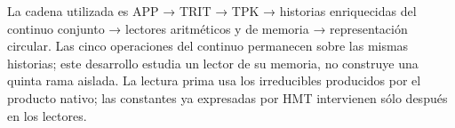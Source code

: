 % 
% 
% 
La cadena utilizada es APP → TRIT → TPK → historias enriquecidas del continuo conjunto → lectores aritméticos y de memoria → representación circular. Las cinco operaciones del continuo permanecen sobre las mismas historias; este desarrollo estudia un lector de su memoria, no construye una quinta rama aislada. La lectura prima usa los irreducibles producidos por el producto nativo; las constantes ya expresadas por HMT intervienen sólo después en los lectores.

